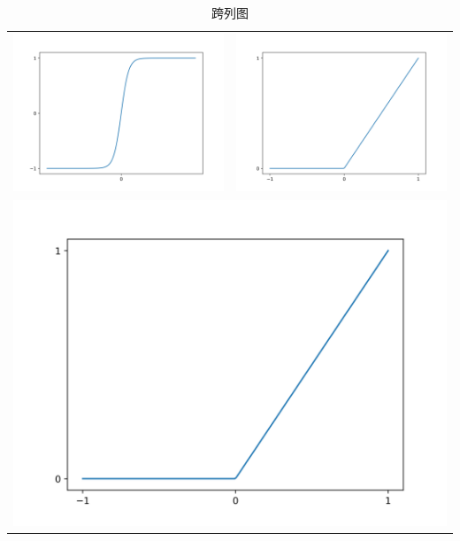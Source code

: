 \documentclass[UTF8,a4paper,8pt,no-math]{article} %
\numberwithin{equation}{section} %
\begin{document}
\begin{table}[htbp]
	\caption{跨列图}
	\center
	\begin{tabular}{ll}
		\includegraphics[scale=0.3]{tanh.png}
		 &
		\includegraphics[scale=0.3]{relu.png} \\
		\multicolumn{2}{c}{\includegraphics[scale=0.5]{relu.png}}
	\end{tabular}
\end{table}

\cleardoublepage
\end{document}
